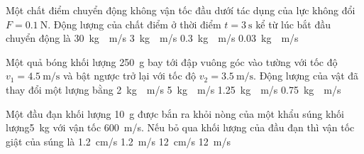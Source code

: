\begin{ex}
	Một chất điểm chuyển động không vận tốc đầu dướí tác dụng của lực không đổi $F=\SI{0.1}{\newton}$. Động lượng của chất điểm ở thời điểm $t=\SI{3}{\second}$ kể từ lúc bắt đầu chuyển động là
	\choice
	{\SI{30}{\kilogram\cdot\meter/\second}}
	{\SI{3}{\kilogram\cdot\meter/\second}}
	{\True \SI{0.3}{\kilogram\cdot\meter/\second}}
	{\SI{0.03}{\kilogram\cdot\meter/\second}}
	\loigiai{}
\end{ex}

\begin{ex}
	Một quả bóng khối lượng \SI{250}{\gram} bay tới đập vuông góc vào tường với tốc độ $v_1=\SI{4.5}{\meter/\second}$ và bật ngược trở lại với tốc độ $v_2=\SI{3.5}{\meter/\second}$. Động lượng của vật đã thay đổi một lượng bằng
	\choice
	{\True \SI{2}{\kilogram\cdot\meter/\second}}
	{\SI{5}{\kilogram\cdot\meter/\second}}
	{\SI{1.25}{\kilogram\cdot\meter/\second}}
	{\SI{0.75}{\kilogram\cdot\meter/\second}}
	\loigiai{}
\end{ex}



\begin{ex}
	Một đầu đạn khối lượng \SI{10}{\gram} được bắn ra khỏi nòng của một khẩu súng khối lượng\SI{5}{\kilogram} với vận tốc \SI{600}{\meter/\second}. Nếu bỏ qua khối lượng của đầu đạn thì vận tốc giật của súng là
	\choice
	{\SI{1.2}{\centi\meter/\second}}
	{\True\SI{1.2}{\meter/\second}}
	{\SI{12}{\centi\meter/\second}}
	{\SI{12}{\meter/\second}}
	\loigiai{}
\end{ex}

